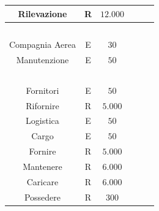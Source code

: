 \begin{tabular}{ | c  c  c | c  c  c | }
	\textsf{\small Rilevazione} & \textsf{\small R} & \textsf{\small $ 12.000 $} & \textsf{\small } & \textsf{\small } & \textsf{\small $ $}\\
	\hline
	\textsf{\small } & \textsf{\small } & \textsf{\small $ $} & \textsf{\small } & \textsf{\small } & \textsf{\small $ $}\\
	\hline
	\textsf{\small Compagnia Aerea} & \textsf{\small E} & \textsf{\small $ 30 $} & \textsf{\small } & \textsf{\small } & \textsf{\small $ $}\\
	\hline
	\textsf{\small Manutenzione} & \textsf{\small E} & \textsf{\small $ 50 $} & \textsf{\small } & \textsf{\small } & \textsf{\small $ $}\\
	\hline
	\textsf{\small } & \textsf{\small } & \textsf{\small $ $} & \textsf{\small } & \textsf{\small } & \textsf{\small $ $}\\
	\hline
	\textsf{\small Fornitori} & \textsf{\small E} & \textsf{\small $ 50 $} & \textsf{\small } & \textsf{\small } & \textsf{\small $ $}\\
	\hline
	\textsf{\small Rifornire} & \textsf{\small R} & \textsf{\small $ 5.000 $} & \textsf{\small } & \textsf{\small } & \textsf{\small $ $}\\
	\hline
	\textsf{\small Logistica} & \textsf{\small E} & \textsf{\small $ 50 $} & \textsf{\small } & \textsf{\small } & \textsf{\small $ $}\\
	\hline
	\textsf{\small Cargo} & \textsf{\small E} & \textsf{\small $ 50 $} & \textsf{\small } & \textsf{\small } & \textsf{\small $ $}\\
	\hline
	\textsf{\small Fornire} & \textsf{\small R} & \textsf{\small $ 5.000 $} & \textsf{\small } & \textsf{\small } & \textsf{\small $ $}\\
	\hline
	\textsf{\small Mantenere} & \textsf{\small R} & \textsf{\small $ 6.000 $} & \textsf{\small } & \textsf{\small } & \textsf{\small $ $}\\
	\hline
	\textsf{\small Caricare} & \textsf{\small R} & \textsf{\small $ 6.000 $} & \textsf{\small } & \textsf{\small } & \textsf{\small $ $}\\
	\hline
	\textsf{\small Possedere} & \textsf{\small R} & \textsf{\small $ 300 $} & \textsf{\small } & \textsf{\small } & \textsf{\small $ $}\\
	\hline
\end{tabular}


\newpage


